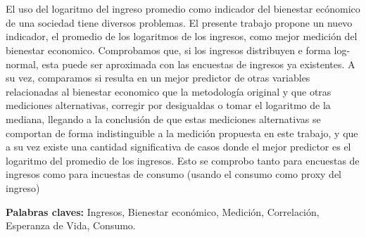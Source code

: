 \chapter*{\runtitulo}

El uso del logaritmo del ingreso promedio como indicador del bienestar ecónomico de una sociedad tiene diversos problemas. El presente trabajo propone un nuevo indicador, el promedio de los logaritmos de los ingresos, como mejor medición del bienestar economico. Comprobamos que, si los ingresos distribuyen e forma log-normal, esta puede ser aproximada con las encuestas de ingresos ya existentes. A su vez, comparamos si resulta en un mejor predictor de otras variables relacionadas al bienestar economico que la metodología original y que otras mediciones alternativas, corregir por desigualdas o tomar el logaritmo de la mediana, llegando a la conclusión de que estas mediciones alternativas se comportan de forma indistinguible a la medición propuesta en este trabajo, y que a su vez existe una cantidad significativa de casos donde el mejor predictor es el logaritmo del promedio de los ingresos. Esto se comprobo tanto para encuestas de ingresos como para incuestas de consumo (usando el consumo como proxy del ingreso)

\noindent\textbf{Palabras claves:} Ingresos, Bienestar económico, Medición, Correlación, Esperanza de Vida, Consumo.